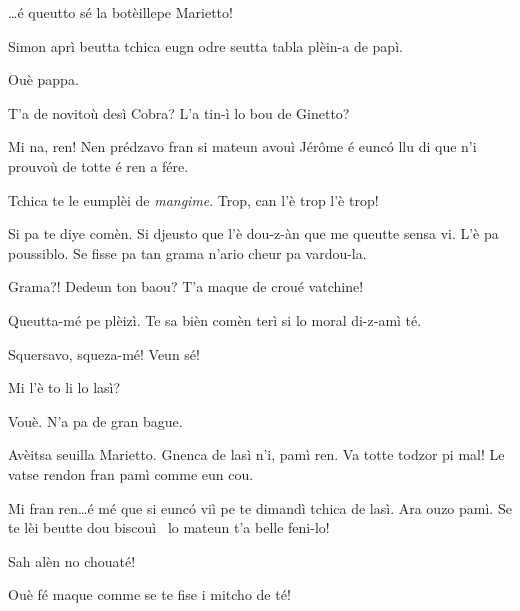 \begin{drama}
\Simonspeaks \ldots é queutto sé la botèille\wine pe Marietto!

\Cienspeaks Simon aprì beutta tchica eugn odre seutta tabla plèin-a de papì.

\Simonspeaks Ouè pappa.


\Mariettospeaks {} T’a de novitoù desì Cobra? L’a tin-ì lo bou de Ginetto?

\Cienspeaks Mi na, ren! Nen prédzavo fran si mateun avouì Jérôme é eunc\'o llu di que n’i prouvoù de totte é ren a fére.

\Mariettospeaks Tchica te le eumplèi de \textit{mangime}. Trop, can l’è trop l’è trop!

\Cienspeaks Si pa te diye comèn. Si djeusto que l’è dou-z-àn que me queutte sensa vi. L’è pa poussiblo. Se fisse pa tan grama n’ario cheur pa vardou-la.

\Mariettospeaks Grama?! Dedeun ton baou? T’a maque de croué va\-tchine!

\Cienspeaks {} Queutta-mé pe plèizì. Te sa bièn comèn terì si lo moral di-z-amì té.

\Mariettospeaks Squersavo, squeza-mé! Veun sé!




\Cienspeaks Mi l’è to li lo lasì?

\Sahlammspeaks Vouè. N’a pa de gran bague.

\Cienspeaks Avèitsa seuilla Marietto. Gnenca de lasì n’i, pamì ren. Va totte todzor pi mal! Le vatse rendon fran pamì comme eun cou.


\Mariettospeaks Mi fran ren\ldots é mé que si eunc\'o viì pe te dimandì tchica de lasì. Ara ouzo pamì. Se te lèi beutte dou biscouì \biscotto\ lo mateun t’a belle feni-lo!


\Mariettospeaks Sah alèn no chouaté!

\Cienspeaks Ouè fé maque comme se te fise i mitcho de té!


\end{drama}
